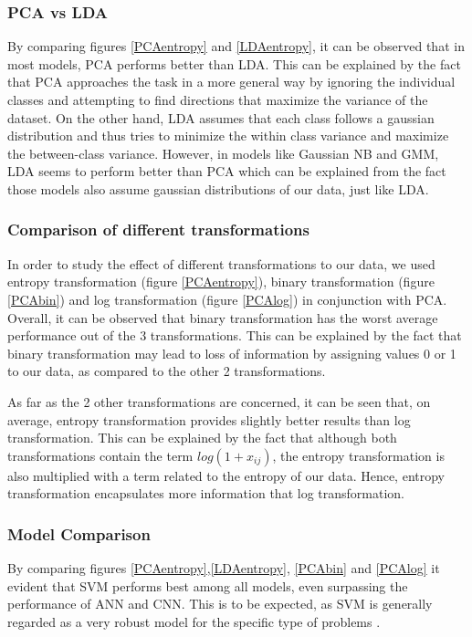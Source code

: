 \documentclass[10pt,journal,compsoc]{IEEEtran}
\begin{document}
\subsubsection{PCA vs LDA}
By comparing figures \ref{PCAentropy} and \ref{LDAentropy},
it can be observed that in most models, PCA performs
better than LDA.
This can be explained by the fact that PCA approaches the
task in a more general way by ignoring the individual classes
and attempting to find directions that maximize the variance of
the dataset.
On the other hand, LDA assumes that each class follows a 
gaussian distribution and thus tries to minimize the
within class variance and maximize the between-class
variance.
However, in models like Gaussian NB and GMM, LDA seems to
perform better than PCA which can be explained from the fact
those models also assume gaussian distributions of our data,
just like LDA.

\subsubsection{Comparison of different transformations}
In order to study the effect of different transformations
to our data, we used entropy transformation (figure \ref{PCAentropy}), 
binary transformation (figure \ref{PCAbin}) and
log transformation (figure \ref{PCAlog}) in conjunction with PCA.
Overall, it can be observed that binary transformation has the
worst average performance out of the 3 transformations.
This can be explained by the fact that binary transformation
may lead to loss of information by assigning values 0 or 1
to our data, as compared to the other 2 transformations.

As far as the 2 other transformations are concerned,
it can be seen that, on average, entropy transformation
provides slightly better results than log transformation.
This can be explained by the fact that although both 
transformations contain the term $log(1+x_{ij})$, 
the entropy transformation is also multiplied with
a term related to the entropy of our data.
Hence, entropy transformation encapsulates more
information that log transformation.

\subsubsection{Model Comparison}
By comparing figures \ref{PCAentropy},\ref{LDAentropy},
\ref{PCAbin} and \ref{PCAlog} it evident that
SVM performs best among all models, even
surpassing the performance of ANN and CNN.
This is to be expected, as SVM is generally regarded
as a very robust model for the specific type of problems 
\cite{a3}.
\end{document}
